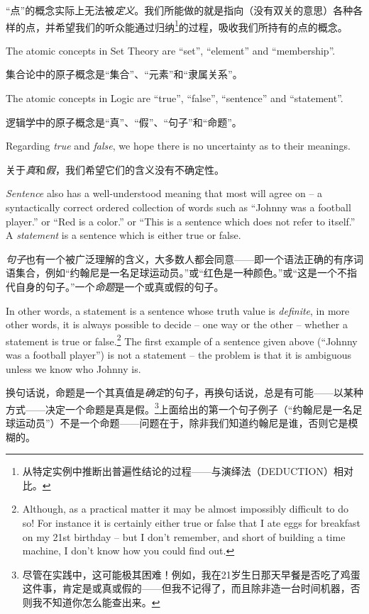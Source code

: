 “点”的概念实际上无法被{\em 定义}。我们所能做的就是指向（没有双关的意思）各种各样的点，并希望我们的听众能通过归纳\footnote{从特定实例中推断出普遍性结论的过程——与演绎法（DEDUCTION）相对比。}的过程，吸收我们所持有的点的概念。

The atomic concepts in Set Theory are ``set'', ``element'' and ``membership''.

集合论中的原子概念是“集合”、“元素”和“隶属关系”。

The atomic concepts in Logic are ``true'', ``false'',  
``sentence'' and  ``statement''.

逻辑学中的原子概念是“真”、“假”、“句子”和“命题”。

Regarding {\em true} and {\em false}, we hope there is no uncertainty
as to their meanings.

关于{\em 真}和{\em 假}，我们希望它们的含义没有不确定性。

{\em Sentence} also has a well-understood
meaning that most will agree on -- a syntactically correct ordered collection
of words such as ``Johnny was a football player.'' or ``Red is a color.''
or ``This is a sentence which does not refer to itself.''  A {\em statement}
is a sentence which is either true or false.

{\em 句子}也有一个被广泛理解的含义，大多数人都会同意——即一个语法正确的有序词语集合，例如“约翰尼是一名足球运动员。”或“红色是一种颜色。”或“这是一个不指代自身的句子。”一个{\em 命题}是一个或真或假的句子。

In other words, a statement
is a sentence whose truth value is {\em definite}, in more other words,
it is always possible to decide -- one way or the other -- whether
a statement is true or false.\footnote{Although, as a practical matter
it may be almost impossibly difficult to do so!
For instance it is 
certainly either true or false that I ate eggs for breakfast on my 21st
birthday -- but I don't remember, and short of building a time machine,
I don't know how you could find out. }   The first example
of a sentence given above (``Johnny was a football player'') is not a 
statement -- the problem is that it is ambiguous unless we know who
Johnny is.

换句话说，命题是一个其真值是{\em 确定}的句子，再换句话说，总是有可能——以某种方式——决定一个命题是真是假。\footnote{尽管在实践中，这可能极其困难！例如，我在21岁生日那天早餐是否吃了鸡蛋这件事，肯定是或真或假的——但我不记得了，而且除非造一台时间机器，否则我不知道你怎么能查出来。}上面给出的第一个句子例子（“约翰尼是一名足球运动员”）不是一个命题——问题在于，除非我们知道约翰尼是谁，否则它是模糊的。

